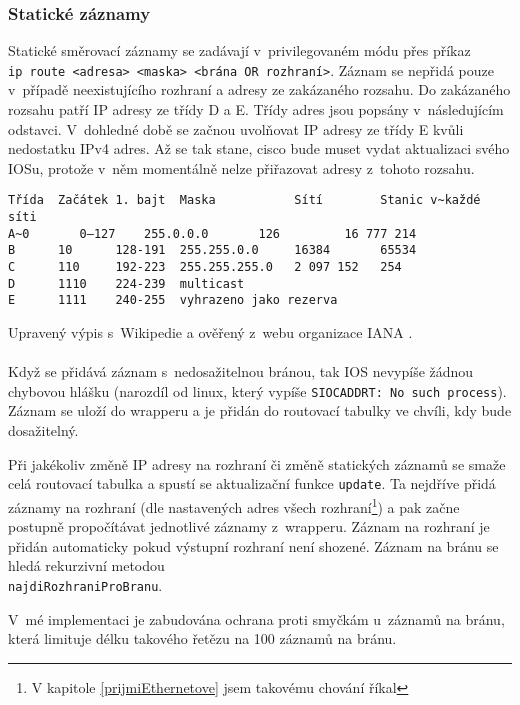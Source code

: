\subsubsection{Statické záznamy}
Statické směrovací záznamy se zadávají v~privilegovaném módu přes příkaz \\\verb|ip route <adresa> <maska> <brána OR rozhraní>|. Záznam se nepřidá pouze v~případě neexistujícího rozhraní a adresy ze zakázaného rozsahu. Do zakázaného rozsahu patří IP adresy ze třídy D a E. Třídy adres jsou popsány v~následujícím odstavci. V~dohledné době se začnou uvolňovat IP adresy ze třídy E kvůli nedostatku IPv4 adres. Až se tak stane, cisco bude muset vydat aktualizaci svého IOSu, protože v~něm momentálně nelze přiřazovat adresy z~tohoto rozsahu.
\begin{verbatim}
Třída  Začátek 1. bajt  Maska           Sítí        Stanic v~každé síti
A~0       0–127    255.0.0.0       126         16 777 214
B      10      128-191  255.255.0.0     16384       65534
C      110     192-223  255.255.255.0   2 097 152   254
D      1110    224-239  multicast
E      1111    240-255  vyhrazeno jako rezerva
\end{verbatim}
Upravený výpis s~Wikipedie \cite{wiki:ip} a ověřený z~webu organizace IANA \cite{iana}.

\paragraph{}
Když se přidává záznam s~nedosažitelnou bránou, tak IOS nevypíše žádnou chybovou hlášku (narozdíl od linux, který vypíše \verb|SIOCADDRT: No such process|). Záznam se uloží do wrapperu a je přidán do routovací tabulky ve chvíli, kdy bude dosažitelný. 

Při jakékoliv změně IP adresy na rozhraní či změně statických záznamů se smaže celá routovací tabulka a spustí se aktualizační funkce \verb|update|. Ta nejdříve přidá záznamy na rozhraní (dle nastavených adres všech rozhraní\footnote{V kapitole \ref{prijmiEthernetove} jsem takovému chování říkal }) a pak začne postupně propočítávat jednotlivé záznamy z~wrapperu. Záznam na rozhraní je přidán automaticky pokud výstupní rozhraní není shozené. Záznam na bránu se hledá rekurzivní metodou\\\verb|najdiRozhraniProBranu|.

V~mé implementaci je zabudována ochrana proti smyčkám u~záznamů na bránu, která limituje délku takového řetězu na 100 záznamů na bránu.

